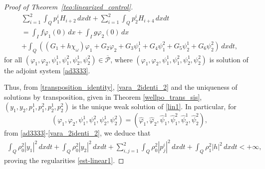 \documentclass[11pt,a4paper]{amsart}
\numberwithin{equation}{section}
\begin{document}
\begin{proof}[Proof of Theorem~\ref{teo:linearized_control}]
\begin{equation}
\begin{array}{l}
	\displaystyle \sum_{i=1}^{2}\int_{Q}p^{i}_{1}H_{i+2}\,dxdt+\sum_{i=1}^{2}\int_{Q}p^{i}_{2}H_{i+4}\,dxdt\\
	\displaystyle = \int_{I}f \varphi_{1}(0)\,dx+\int_{I}g \varphi_{2}(0)\,dx\\
	\displaystyle +\int_{Q}\left( (G_{1}+h\chi_{\omega})\varphi_{1}+G_{2}\varphi_{2}+G_{3}\psi^{1}_{1}+G_{4}\psi^{2}_{1}+G_{5}\psi^{1}_{2}+G_{6}\psi^{2}_{2} \right)\,dxdt, 
\end{array}
\end{equation}for all $(\varphi_{1},\varphi_{2},\psi^{1}_{1},\psi^{2}_{1},\psi^{1}_{2},\psi^{2}_{2})\in \overline{\mathcal{P}}$, where  $(\varphi_{1},\varphi_{2},\psi^{1}_{1},\psi^{2}_{1},\psi^{1}_{2},\psi^{2}_{2})$  is    solution  of the adjoint system \eqref{ad3333}.

\noindent Thus,  from \eqref{transposition_identity},  \eqref{vara_2identi_2} and  the uniqueness of solutions by transposition, given in Theorem \ref{wellpo_trans_sis}, $(y_{1},y_{2},p^{1}_{1},p^{2}_{1}, p^{1}_{2},p^{2}_{2})$ is the unique weak solution of \eqref{lin1}. In particular, for
\begin{equation*}
(\varphi_{1},\varphi_{2},\psi^{1}_{1},\psi^{2}_{1},\psi^{1}_{2},\psi^{2}_{2}) = (\hat{\varphi}_{1}, \hat{\varphi}_{2}, \hat{\psi}^{1}_{1}, \hat{\psi}^{2}_{1}, \hat{\psi}^{1}_{2}, \hat{\psi}^{2}_{2}),
\end{equation*}from \eqref{ad3333}-\eqref{vara_2identi_2}, we deduce that
\begin{align*}
\displaystyle \int_{Q}\rho^{2}_{0}|y_{1}|^{2}\,dxdt + \int_{Q}\rho^{2}_{0}|y_{2}|^{2}\,dxdt  +\sum_{i,j=1}^{2}\int_{Q}\rho^{2}_{0}|p^{i}_{j}|^{2}\,dxdt+\int_{Q}\rho^{2}_{1}|h|^{2}\,dxdt<+\infty,
\end{align*}proving the regularities \eqref{est-linear1}.


\end{proof}
\end{document}

